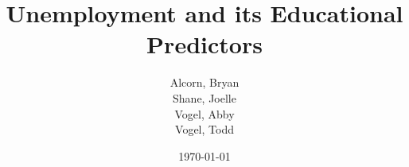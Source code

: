 \documentclass{article}
\begin{document}


\title{Unemployment and its Educational Predictors}
\author{
Alcorn, Bryan\\
Shane, Joelle\\
Vogel, Abby\\
Vogel, Todd\\
}
\date{\today}

\maketitle

\begin{abstract}

\end{abstract}
\end{document}
